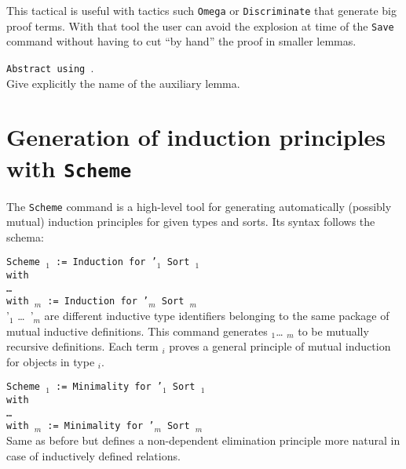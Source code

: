 This tactical is useful with tactics such \texttt{Omega} or
\texttt{Discriminate} that generate big proof terms. With that tool
the user can avoid the explosion at time of the \texttt{Save} command
without having to cut ``by hand'' the proof in smaller lemmas.

\begin{Variants}
\item \texttt{Abstract {\tac} using {\ident}}.\\
  Give explicitly the name of the auxiliary lemma.
\end{Variants}

\section{Generation of induction principles with {\tt Scheme}}
\label{Scheme}

The {\tt Scheme} command is a high-level tool for generating
automatically (possibly mutual) induction principles for given types
and sorts.  Its syntax follows the schema:

\noindent
{\tt Scheme {\ident$_1$} := Induction for \ident'$_1$ Sort {\sort$_1$} \\
  with\\
  \mbox{}\hspace{0.1cm} \dots\ \\
        with {\ident$_m$} := Induction for {\ident'$_m$} Sort
        {\sort$_m$}}\\

\ident'$_1$ \dots\ \ident'$_m$ are different inductive type
identifiers belonging to
the same package of mutual inductive definitions. This command
generates {\ident$_1$}\dots{} {\ident$_m$} to be mutually recursive
definitions. Each term {\ident$_i$} proves a general principle 
of mutual induction for objects in type {\term$_i$}. 


\begin{Variants}
\item {\tt Scheme {\ident$_1$} := Minimality for \ident'$_1$ Sort {\sort$_1$} \\
    with\\
    \mbox{}\hspace{0.1cm} \dots\ \\
    with {\ident$_m$} := Minimality for {\ident'$_m$} Sort
    {\sort$_m$}}\\
  Same as before but defines a non-dependent elimination principle more
  natural in case of inductively defined relations. 
\end{Variants}

